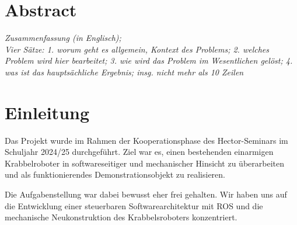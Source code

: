 \section*{Abstract}

\textit{Zusammenfassung (in Englisch); \\ Vier Sätze: 1. worum geht es allgemein, Kontext des Problems; 2. welches Problem wird hier bearbeitet; 3. wie wird das Problem im Wesentlichen gelöst; 4. was ist das hauptsächliche Ergebnis; insg. nicht mehr als 10 Zeilen}

\section{Einleitung}

Das Projekt wurde im Rahmen der Kooperationsphase des Hector-Seminars im Schuljahr 2024/25 durchgeführt. 
Ziel war es, einen bestehenden einarmigen Krabbelroboter in softwareseitiger und mechanischer Hinsicht zu überarbeiten und als funktionierendes Demonstrationsobjekt zu realisieren.

Die Aufgabenstellung war dabei bewusst eher frei gehalten. Wir haben uns auf die Entwicklung einer steuerbaren Softwarearchitektur mit ROS und die mechanische Neukonstruktion des Krabbelsroboters konzentriert. 